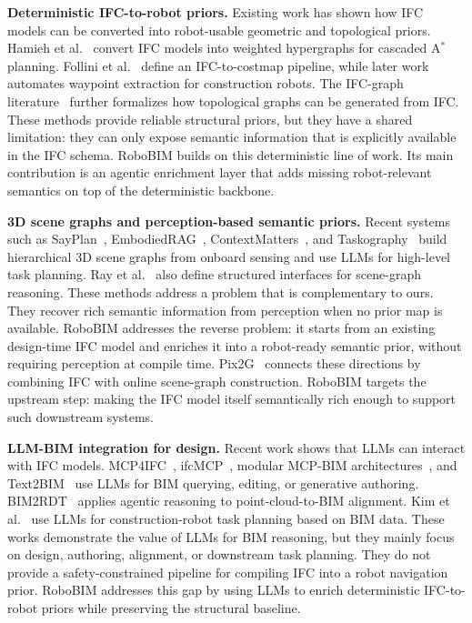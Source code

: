 \documentclass[a4paper, 10pt, conference]{ieeeconf}
\begin{document}
\textbf{Deterministic IFC-to-robot priors.} Existing work has shown how IFC models can be converted into robot-usable geometric and topological priors. Hamieh et al.~\cite{hamieh2021, hamieh2025} convert IFC models into weighted hypergraphs for cascaded A$^{*}$ planning. Follini et al.~\cite{follini2020} define an IFC-to-costmap pipeline, while later work~\cite{kim2021bim, kim2022semantic, constructionrobotics2023} automates waypoint extraction for construction robots. The IFC-graph literature~\cite{teo2018igit, lin2020igssnn, zhu2024graph, ifcgraph2025} further formalizes how topological graphs can be generated from IFC. These methods provide reliable structural priors, but they have a shared limitation: they can only expose semantic information that is explicitly available in the IFC schema. RoboBIM builds on this deterministic line of work. Its main contribution is an agentic enrichment layer that adds missing robot-relevant semantics on top of the deterministic backbone.

\textbf{3D scene graphs and perception-based semantic priors.} Recent systems such as SayPlan~\cite{rana2023sayplan}, EmbodiedRAG~\cite{booker2024embodiedrag}, ContextMatters~\cite{contextmatters2026}, and Taskography~\cite{agia2022taskography} build hierarchical 3D scene graphs from onboard sensing and use LLMs for high-level task planning. Ray et al.~\cite{ray2025structured} also define structured interfaces for scene-graph reasoning. These methods address a problem that is complementary to ours. They recover rich semantic information from perception when no prior map is available. RoboBIM addresses the reverse problem: it starts from an existing design-time IFC model and enriches it into a robot-ready semantic prior, without requiring perception at compile time. Pix2G~\cite{longo2025pix2g} connects these directions by combining IFC with online scene-graph construction. RoboBIM targets the upstream step: making the IFC model itself semantically rich enough to support such downstream systems.

\textbf{LLM-BIM integration for design.} Recent work shows that LLMs can interact with IFC models. MCP4IFC~\cite{nithyanantham2025mcp4ifc}, ifcMCP~\cite{lin2025ifcmcp}, modular MCP-BIM architectures~\cite{mcpbimarch2025}, and Text2BIM~\cite{du2024text2bim} use LLMs for BIM querying, editing, or generative authoring. BIM2RDT~\cite{bim2rdt2025} applies agentic reasoning to point-cloud-to-BIM alignment. Kim et al.~\cite{kim2025llmrobot} use LLMs for construction-robot task planning based on BIM data. These works demonstrate the value of LLMs for BIM reasoning, but they mainly focus on design, authoring, alignment, or downstream task planning. They do not provide a safety-constrained pipeline for compiling IFC into a robot navigation prior. RoboBIM addresses this gap by using LLMs to enrich deterministic IFC-to-robot priors while preserving the structural baseline.
\end{document}

